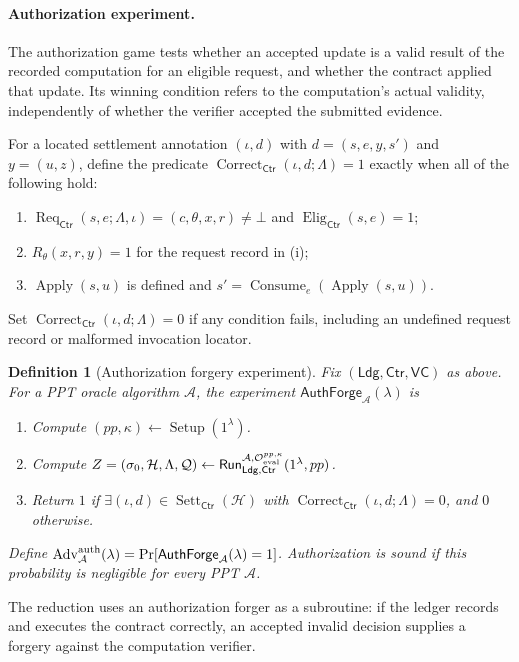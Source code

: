 \documentclass[10pt,letterpaper]{article}
\newtheorem{definition}{Definition}
\newcommand{\Ldg}{\mathsf{Ldg}}
\newcommand{\Ctr}{\mathsf{Ctr}}
\newcommand{\EvalO}{\mathcal O_{\rm eval}}
\begin{document}
\paragraph{Authorization experiment.}
The authorization game tests whether an accepted update is a valid result of the recorded computation for an eligible request, and whether the contract applied that update. Its winning condition refers to the computation's actual validity, independently of whether the verifier accepted the submitted evidence.

For a located settlement annotation $(\iota,d)$ with $d=(s,e,y,s')$ and $y=(u,z)$, define the predicate $\operatorname{Correct}_{\Ctr}(\iota,d;\Lambda)=1$ exactly when all of the following hold:
\begin{enumerate}[label=(\roman*)]
 \item $\operatorname{Req}_{\Ctr}(s,e;\Lambda,\iota)=(c,\theta,x,r)\ne\bot$ and $\operatorname{Elig}_{\Ctr}(s,e)=1$;
 \item $R_\theta(x,r,y)=1$ for the request record in (i);
 \item $\operatorname{Apply}(s,u)$ is defined and $s'=\operatorname{Consume}_e(\operatorname{Apply}(s,u))$.
\end{enumerate}
Set $\operatorname{Correct}_{\Ctr}(\iota,d;\Lambda)=0$ if any condition fails, including an undefined request record or malformed invocation locator.

\begin{definition}[Authorization forgery experiment]
\label{def:authforge}
Fix $(\Ldg,\Ctr,\mathsf{VC})$ as above. For a PPT oracle algorithm $\mathcal A$, the experiment $\mathsf{AuthForge}_{\mathcal A}(\lambda)$ is
\begin{enumerate}[label=\arabic*.]
 \item Compute $(pp,\kappa)\leftarrow\operatorname{Setup}(1^\lambda)$.
 \item Compute $Z=(\sigma_0,\mathcal H,\Lambda,\mathcal Q)\leftarrow
       \mathsf{Run}_{\Ldg,\Ctr}^{\mathcal A,\EvalO^{pp,\kappa}}(1^\lambda,pp)$.
 \item Return $1$ if $\exists(\iota,d)\in\operatorname{Sett}_{\Ctr}(\mathcal H)$ with $\operatorname{Correct}_{\Ctr}(\iota,d;\Lambda)=0$, and $0$ otherwise.
\end{enumerate}
Define $\operatorname{Adv}^{\rm auth}_{\mathcal A}(\lambda)
=\Pr[\mathsf{AuthForge}_{\mathcal A}(\lambda)=1]$. Authorization is sound if this probability is negligible for every PPT $\mathcal A$.
\end{definition}
The reduction uses an authorization forger as a subroutine: if the ledger records and executes the contract correctly, an accepted invalid decision supplies a forgery against the computation verifier.
\end{document}
